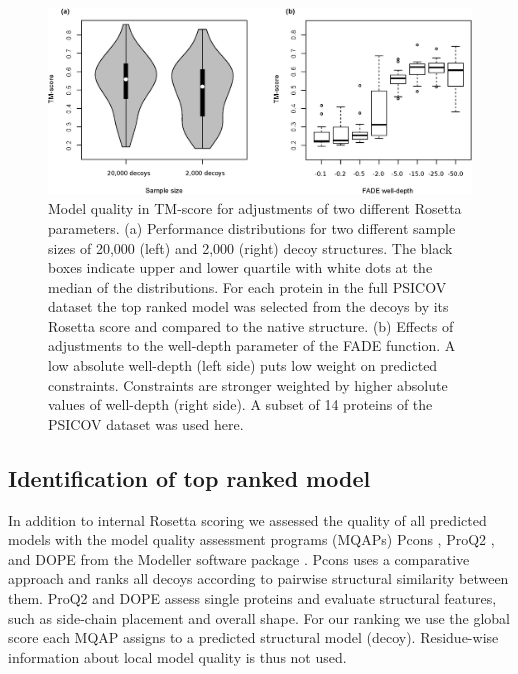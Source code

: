 \documentclass{bioinfo}
\begin{document}
\begin{methods}
\begin{figure}[!tpb]%
\centerline{\includegraphics[scale=0.6]{figures/rosetta.eps}}
\caption{Model quality in TM-score for adjustments of two
 different Rosetta parameters. (a) Performance distributions 
 for two different sample sizes of 20,000 (left) and 2,000 (right) 
 decoy structures. The black boxes indicate upper and lower 
 quartile with white dots at the median of the distributions. For each 
 protein in the full PSICOV dataset the top 
 ranked model was selected from the decoys by its Rosetta score and 
 compared to the native structure. (b) Effects of adjustments to 
 the well-depth parameter of the FADE function. A low absolute 
 well-depth (left side) puts low weight on predicted constraints. 
 Constraints are stronger weighted by higher absolute values of 
 well-depth (right side). A subset of 14 proteins of the PSICOV dataset was used here.}\label{fig:ros} 
\end{figure}



\subsection{Identification of top ranked model}

In addition to internal Rosetta scoring we assessed the quality of all
predicted models with the model quality assessment programs (MQAPs)
Pcons \cite[]{lundstrom_pcons:_2001}, ProQ2
\cite[]{ray_improved_2012}, and DOPE from the Modeller software
package \cite[]{eswar_comparative_2006}. Pcons uses a comparative
approach and ranks all decoys according to pairwise structural
similarity between them. ProQ2 and DOPE assess single proteins and
evaluate structural features, such as side-chain placement and overall
shape. For our ranking we use the global score each MQAP assigns to a
predicted structural model (decoy). Residue-wise information about
local model quality is thus not used. 


\end{methods}
\end{document}
